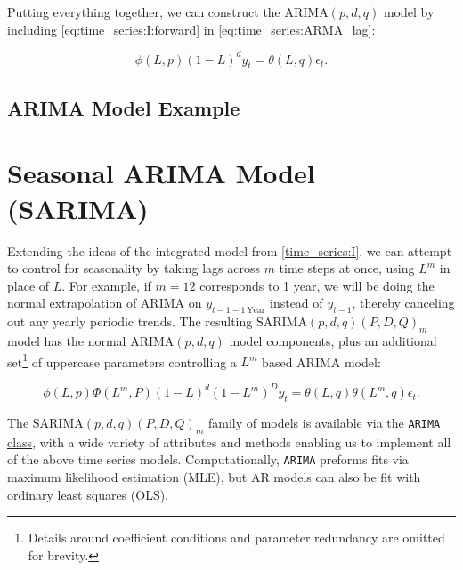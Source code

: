 Putting everything together, we can construct the $\text{ARIMA}\left(p,d,q\right)$ model
by including \cref{eq:time_series:I:forward} in \cref{eq:time_series:ARMA_lag}:

\begin{equation}\label{eq:time_series:ARIMA}
\phi\left(L,p\right) \left(1-L\right)^{d} y_{t} = \theta\left(L,q\right) \epsilon_{t}.
\end{equation}

\subsection{ARIMA Model Example}
\label{time_series:ARIMA:ex}


\section{Seasonal ARIMA Model (SARIMA)}
\label{time_series:SARIMA}

Extending the ideas of the integrated model from \cref{time_series:I},
we can attempt to control for seasonality by
taking lags across $m$ time steps at once, \ie using $L^{m}$ in place of $L$.
For example, if $m=12$ corresponds to 1 year,
we will be doing the normal extrapolation of ARIMA on $y_{t-1-1\,\text{Year}}$ instead of $y_{t-1}$,
thereby canceling out any yearly periodic trends.
The resulting $\text{SARIMA}\left(p,d,q\right)\left(P,D,Q\right)_{m}$ model
has the normal $\text{ARIMA}\left(p,d,q\right)$ model components,
plus an additional set\footnote{Details around
coefficient conditions and parameter redundancy are omitted for brevity.} of uppercase parameters
controlling a $L^{m}$ based ARIMA model:

\begin{equation}\label{eq:time_series:SARMA}
\phi\left(L,p\right) \Phi\left(L^{m},P\right) \left(1-L\right)^{d} \left(1-L^{m}\right)^{D} y_{t} = \theta\left(L,q\right) \theta\left(L^{m},q\right) \epsilon_{t}.
\end{equation}

The $\text{SARIMA}\left(p,d,q\right)\left(P,D,Q\right)_{m}$ family of models
is available via the \texttt{ARIMA}
\href{https://www.statsmodels.org/stable/generated/statsmodels.tsa.arima.model.ARIMA.html}{class},
with a wide variety of attributes and methods
enabling us to implement all of the above time series models.
Computationally, \texttt{ARIMA} preforms fits via maximum likelihood estimation (MLE),
but AR models can also be fit with ordinary least squares (OLS).

